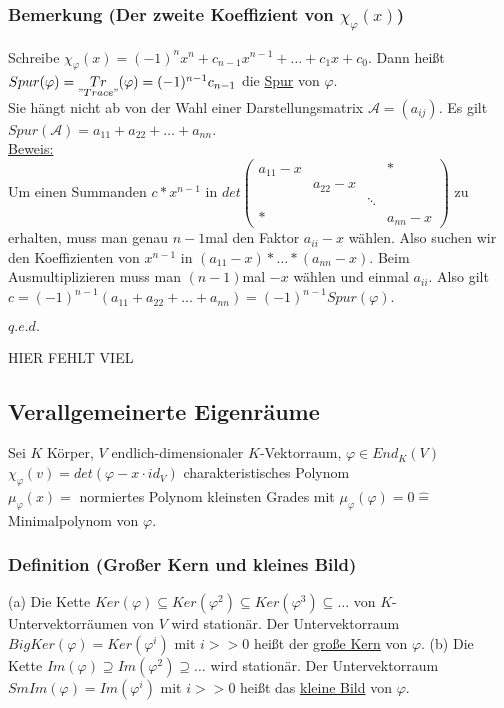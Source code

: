 \documentclass[a4paper]{article}
\newcommand{\ul}{\underline}
\renewcommand{\qed}{\begin{flushright}
\ul{\(q.e.d.\)}
\end{flushright}}
\let\phi\varphi
\begin{document}
\subsubsection{Bemerkung (Der zweite Koeffizient von \(\chi_\phi(x)\))}
Schreibe \(\chi_\phi(x)=(-1)^nx^n+c_{n-1}x^{n-1}+\dots+c_1x+c_0\). Dann heißt \(Spur(\phi)=\underset{"Trace"}{Tr}(\phi)=(-1)^{n-1}c_{n-1}\) die \ul{Spur} von \(\phi\).\\
Sie hängt nicht ab von der Wahl einer Darstellungsmatrix \(\mathcal{A}=(a_{ij})\). Es gilt \(Spur(\mathcal{A})=a_{11}+a_{22}+\dots+a_{nn}\).\\
\ul{Beweis:}\\
Um einen Summanden \(c*x^{n-1}\) in \(det\begin{pmatrix}
a_{11}-x & & & * \\
 & a_{22}-x & & \\
 & & \ddots & \\
* & & & a_{nn}-x
\end{pmatrix}\) zu erhalten, muss man genau \(n-1\)mal den Faktor \(a_{ii}-x\) wählen. Also suchen wir den Koeffizienten von \(x^{n-1}\) in \((a_{11}-x)*\dots*(a_{nn}-x)\). Beim Ausmultiplizieren muss man \((n-1)\)mal \(-x\) wählen und einmal \(a_{ii}\). Also gilt \(c=(-1)^{n-1}(a_{11}+a_{22}+\dots+a_{nn})=(-1)^{n-1} Spur(\phi)\).
\qed
HIER FEHLT VIEL
\setcounter{subsection}{21}
\subsection{Verallgemeinerte Eigenräume}
Sei \(K\) Körper, \(V\) endlich-dimensionaler \(K\)-Vektorraum, \(\phi \in End_K(V)\)\\
\(\chi_\phi(v)=det(\phi-x\cdot id_V)\) charakteristisches Polynom\\
\(\mu_\phi(x)=\) normiertes Polynom kleinsten Grades mit \(\mu_\phi (\phi) = 0 \hat{=}\) Minimalpolynom von \(\phi\).
\subsubsection{Definition (Großer Kern und kleines Bild)}
(a) Die Kette \(Ker(\phi) \subseteq Ker(\phi^2) \subseteq Ker(\phi^3) \subseteq \dots\) von \(K\)-Untervektorräumen von \(V\) wird stationär. Der Untervektorraum \(BigKer(\phi)=Ker(\phi^i)\) mit \(i >> 0\) heißt der \ul{große Kern} von \(\phi\).
(b) Die Kette \(Im(\phi) \supseteq Im(\phi^2) \supseteq \dots\) wird stationär. Der Untervektorraum \(SmIm(\phi) = Im(\phi^i)\) mit \(i >> 0\) heißt das \ul{kleine Bild} von \(\phi\).
\end{document}
